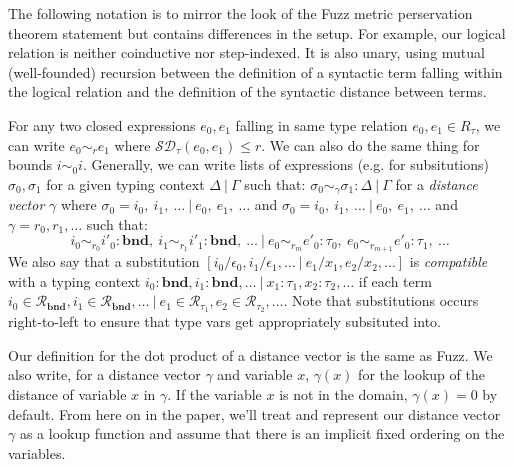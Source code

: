 The following notation is to mirror the look of the Fuzz metric perservation
theorem statement but contains differences in the setup. For example, our
logical relation is neither coinductive nor step-indexed. It is also unary,
using mutual (well-founded) recursion between the definition of a syntactic term
falling within the logical relation and the definition of the syntactic distance
between terms.

For any two closed expressions $e_0, e_1$ falling in same type relation $e_0,
e_1 \in R_\tau$, we can write $e_0 \sim_r e_1$ where $\mathcal{SD}_{\tau}(e_0,
e_1) \leq r$. We can also do the same thing for bounds $i \sim_0 i$. Generally,
we can write lists of expressions (e.g. for subsitutions) $\sigma_0, \sigma_1$
for a given typing context $\Delta \ | \ \Gamma$ such that: $\sigma_0 \sim_{\gamma} \sigma_1
: \Delta \ | \ \Gamma$ for a \textit{distance vector}
$\gamma$
where
$\sigma_0 = i_0,~i_1,~\ldots \ | \ e_0,~e_1,~\ldots$ 
and 
$\sigma_0 = i_0,~i_1,~\ldots \ | \ e_0,~e_1,~\ldots$ 
and $\gamma = r_0, r_1, \ldots$ such that:
$$
i_0 \sim_{r_0} i'_0 : \mathbf{bnd},~i_1 \sim_{r_1} i'_1 : \mathbf{bnd},~\ldots 
\ | \ e_0 \sim_{r_m} e'_0 : \tau_0,~e_0 \sim_{r_{m+1}} e'_0 : \tau_1,~\ldots
$$
We also say that a substitution $[i_0 / \epsilon_0, i_1 / \epsilon_1, \ldots \ | \ e_1/x_1, e_2/x_2, \ldots]$ is
\textit{compatible} with a typing context 
$i_0 : \mathbf{bnd}, i_1 : \mathbf{bnd}, \ldots \ | \ x_1 : \tau_1, x_2 : \tau_2, \ldots$
if each term 
$i_0 \in \mathcal{R}_{\mathbf{bnd}}, 
i_1 \in \mathcal{R}_{\mathbf{bnd}}, \ldots \ | \ 
e_1 \in \mathcal{R}_{\tau_1}, e_2 \in \mathcal{R}_{\tau_2}, \ldots$.
Note that substitutions occurs right-to-left to ensure that type vars get
appropriately subsituted into.

Our definition for the dot product of a distance vector is the same as Fuzz. We
also write, for a distance vector $\gamma$ and variable $x$, $\gamma(x)$ for the
lookup of the distance of variable $x$ in $\gamma$. If the variable $x$ is not
in the domain, $\gamma(x) = 0$ by default. From here on in the paper, we'll
treat and represent our distance vector $\gamma$ as a lookup function and assume
that there is an implicit fixed ordering on the variables.

